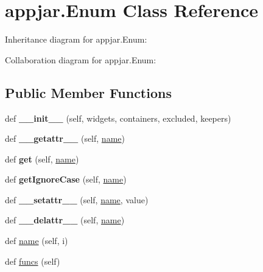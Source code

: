\hypertarget{classappjar_1_1_enum}{}\section{appjar.\+Enum Class Reference}
\label{classappjar_1_1_enum}


Inheritance diagram for appjar.\+Enum\+:


Collaboration diagram for appjar.\+Enum\+:
\subsection*{Public Member Functions}
\begin{DoxyCompactItemize}
\item 
\mbox{\label{classappjar_1_1_enum_a34baeb720c06c1caf953c1b453036cbd}} 
def {\bfseries \+\_\+\+\_\+init\+\_\+\+\_\+} (self, widgets, containers, excluded, keepers)
\item 
\mbox{\label{classappjar_1_1_enum_aceee049ac944a386c6fad4118ee89312}} 
def {\bfseries \+\_\+\+\_\+getattr\+\_\+\+\_\+} (self, \hyperlink{classappjar_1_1_enum_a9b6e97ebe09d5b42613fcb70faddadfa}{name})
\item 
\mbox{\label{classappjar_1_1_enum_a5bcba037d54889023502a4ef70171313}} 
def {\bfseries get} (self, \hyperlink{classappjar_1_1_enum_a9b6e97ebe09d5b42613fcb70faddadfa}{name})
\item 
\mbox{\label{classappjar_1_1_enum_a261a405acbac1c0426bf46caee80d31c}} 
def {\bfseries get\+Ignore\+Case} (self, \hyperlink{classappjar_1_1_enum_a9b6e97ebe09d5b42613fcb70faddadfa}{name})
\item 
\mbox{\label{classappjar_1_1_enum_a561a3f04d00e87d49b40ca19b63ebeb4}} 
def {\bfseries \+\_\+\+\_\+setattr\+\_\+\+\_\+} (self, \hyperlink{classappjar_1_1_enum_a9b6e97ebe09d5b42613fcb70faddadfa}{name}, value)
\item 
\mbox{\label{classappjar_1_1_enum_ade8e956c31508b2140ec08cea410f873}} 
def {\bfseries \+\_\+\+\_\+delattr\+\_\+\+\_\+} (self, \hyperlink{classappjar_1_1_enum_a9b6e97ebe09d5b42613fcb70faddadfa}{name})
\item 
def \hyperlink{classappjar_1_1_enum_a9b6e97ebe09d5b42613fcb70faddadfa}{name} (self, i)
\item 
def \hyperlink{classappjar_1_1_enum_a04d8f9175ef44a7473aabd410e31529d}{funcs} (self)
\end{DoxyCompactItemize}
